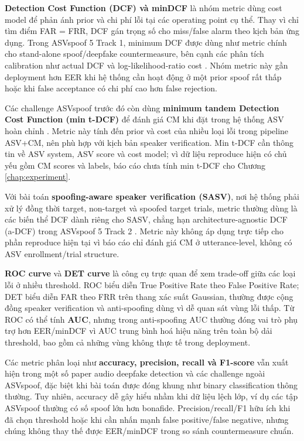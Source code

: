 \textbf{Detection Cost Function (DCF) và minDCF} là nhóm metric dùng cost model để phản ánh prior và chi phí lỗi tại các operating point cụ thể. Thay vì chỉ tìm điểm FAR = FRR, DCF gán trọng số cho miss/false alarm theo kịch bản ứng dụng. Trong ASVspoof 5 Track 1, minimum DCF được dùng như metric chính cho stand-alone spoof/deepfake countermeasure, bên cạnh các phân tích calibration như actual DCF và log-likelihood-ratio cost \cite{asvspoof5_eval}. Nhóm metric này gần deployment hơn EER khi hệ thống cần hoạt động ở một prior spoof rất thấp hoặc khi false acceptance có chi phí cao hơn false rejection.

Các challenge ASVspoof trước đó còn dùng \textbf{minimum tandem Detection Cost Function (min t-DCF)} để đánh giá CM khi đặt trong hệ thống ASV hoàn chỉnh \cite{tdcf}. Metric này tính đến prior và cost của nhiều loại lỗi trong pipeline ASV+CM, nên phù hợp với kịch bản speaker verification. Min t-DCF cần thông tin về ASV system, ASV score và cost model; vì dữ liệu reproduce hiện có chủ yếu gồm CM scores và labels, báo cáo chưa tính min t-DCF cho Chương \ref{chap:experiment}.

Với bài toán \textbf{spoofing-aware speaker verification (SASV)}, nơi hệ thống phải xử lý đồng thời target, non-target và spoofed target trials, metric thường dùng là các biến thể DCF dành riêng cho SASV, chẳng hạn architecture-agnostic DCF (a-DCF) trong ASVspoof 5 Track 2 \cite{asvspoof5_eval}. Metric này không áp dụng trực tiếp cho phần reproduce hiện tại vì báo cáo chỉ đánh giá CM ở utterance-level, không có ASV enrollment/trial structure.

\textbf{ROC curve} và \textbf{DET curve} là công cụ trực quan để xem trade-off giữa các loại lỗi ở nhiều threshold. ROC biểu diễn True Positive Rate theo False Positive Rate; DET biểu diễn FAR theo FRR trên thang xác suất Gaussian, thường được cộng đồng speaker verification và anti-spoofing dùng vì dễ quan sát vùng lỗi thấp. Từ ROC có thể tính \textbf{AUC}, nhưng trong anti-spoofing AUC thường đóng vai trò phụ trợ hơn EER/minDCF vì AUC trung bình hoá hiệu năng trên toàn bộ dải threshold, bao gồm cả những vùng không thực tế trong deployment.

Các metric phân loại như \textbf{accuracy, precision, recall và F1-score} vẫn xuất hiện trong một số paper audio deepfake detection và các challenge ngoài ASVspoof, đặc biệt khi bài toán được đóng khung như binary classification thông thường. Tuy nhiên, accuracy dễ gây hiểu nhầm khi dữ liệu lệch lớp, ví dụ các tập ASVspoof thường có số spoof lớn hơn bonafide. Precision/recall/F1 hữu ích khi đã chọn threshold hoặc khi cần nhấn mạnh false positive/false negative, nhưng chúng không thay thế được EER/minDCF trong so sánh countermeasure chuẩn.

